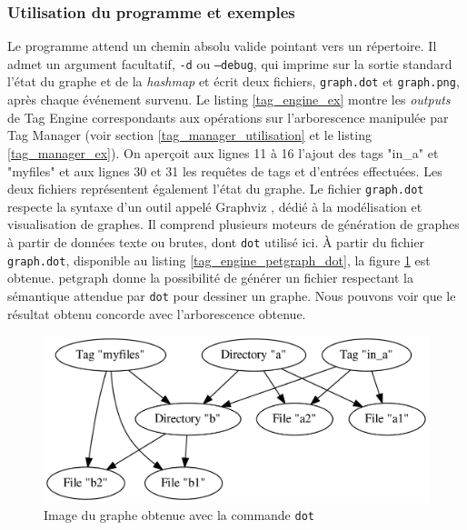 \subsubsection{Utilisation du programme et exemples}
Le programme attend un chemin absolu valide pointant vers un répertoire. Il admet un argument 
facultatif, \texttt{-d} ou \texttt{--debug}, qui imprime sur la sortie 
standard l'état du graphe et de la \textit{hashmap} et écrit deux fichiers, \texttt{graph.dot} 
et \texttt{graph.png}, après chaque événement survenu. Le listing \ref{tag_engine_ex} montre les 
\textit{outputs} de Tag Engine correspondants aux opérations sur l'arborescence manipulée par 
Tag Manager (voir section \ref{tag_manager_utilisation} et le listing \ref{tag_manager_ex}). 
On aperçoit aux lignes 11 à 16 l'ajout des tags "in\_a" et "myfiles" et aux lignes 30 et 31 les 
requêtes de tags et d'entrées effectuées.
Les deux fichiers représentent également l'état du graphe. Le fichier \texttt{graph.dot} 
respecte la syntaxe d'un outil appelé Graphviz \cite{ref50}, dédié à la modélisation et visualisation 
de graphes. Il comprend plusieurs moteurs de génération de graphes à partir de données texte ou 
brutes, dont \texttt{dot} utilisé ici. À partir du fichier \texttt{graph.dot}, disponible au 
listing \ref{tag_engine_petgraph_dot}, la figure \ref{tag_engine_petgraph_dot_image} est obtenue. 
petgraph donne la possibilité de générer un fichier respectant la sémantique attendue par \texttt{dot} 
pour dessiner un graphe. Nous pouvons voir que le résultat obtenu concorde avec l'arborescence obtenue.
\bigbreak
{}
\bigbreak
\bigbreak
{}
\bigbreak
\begin{figure}
    \begin{center}
        \includegraphics[width=1\textwidth]{images/graph.png}
    \end{center}
    \caption{Image du graphe obtenue avec la commande \texttt{dot}}
    \label{tag_engine_petgraph_dot_image}
\end{figure}

